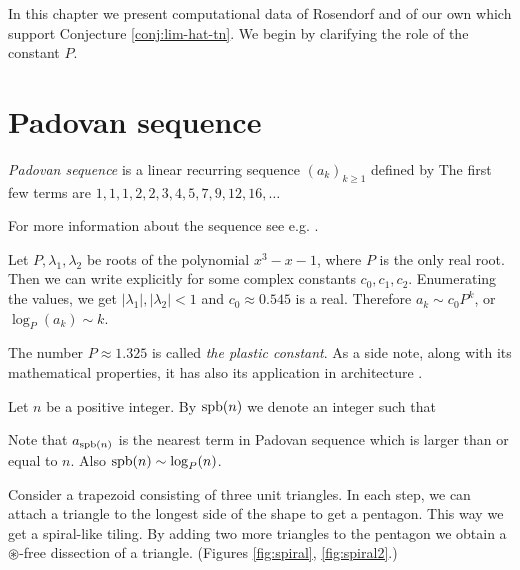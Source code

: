 In this chapter we present computational data of Rosendorf \cite{Rosendorf04} and of our own which support Conjecture \ref{conj:lim-hat-tn}. We begin by clarifying the role of the constant $P$.


\section{Padovan sequence}

\begin{defn}
\emph{Padovan sequence} is a linear recurring sequence $(a_k)_{k \geq 1}$ defined by
%
The first few terms are $1, 1, 1, 2, 2, 3, 4, 5, 7, 9, 12, 16,\dots$
\end{defn}

For more information about the sequence see e.g. \cite{OEIS}.

Let $P, \lambda_1, \lambda_2$ be roots of the polynomial $x^3-x-1$, where $P$ is the only real root. Then we can write explicitly
%
for some complex constants $c_0,c_1,c_2$. Enumerating the values, we get $|\lambda_1|, |\lambda_2| < 1$ and $c_0 \approx 0.545$ is a real. Therefore $a_k \sim c_0P^k$, or $\log_P(a_k) \sim k$.

The number $P \approx 1.325$ is called \emph{the plastic constant}. As a side note, along with its mathematical properties, it has also its application in architecture \cite{Stewart96}.

\begin{defn}
Let $n$ be a positive integer. By $\mathop{\mathrm{spb}}(n)$ we denote an integer such that
\end{defn}

Note that $a_{\mathop{\mathrm{spb}}(n)}$ is the nearest term in Padovan sequence which is larger than or equal to $n$. Also $\mathop{\mathrm{spb}}(n) \sim \log_P(n)$.

\bigskip

Consider a trapezoid consisting of three unit triangles. In each step, we can attach a triangle to the longest side of the shape to get a pentagon. This way we get a spiral-like tiling. By adding two more triangles to the pentagon we obtain a $\circledast$-free dissection of a triangle. (Figures \ref{fig:spiral}, \ref{fig:spiral2}.)

